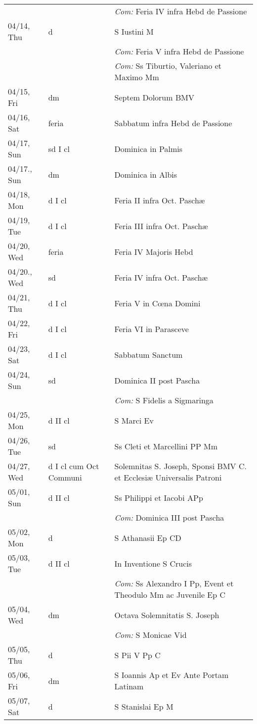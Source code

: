 \documentclass[10pt]{article}
\begin{document}
\begin{longtable}{ l l l }
 & & \textit{Com:} Feria IV infra Hebd de Passione\\
04/14, Thu & d & S Iustini M\\
 & & \textit{Com:} Feria V infra Hebd de Passione\\
 & & \textit{Com:} Ss Tiburtio, Valeriano et Maximo Mm\\
04/15, Fri & dm & Septem Dolorum BMV\\
04/16, Sat & feria & Sabbatum infra Hebd de Passione\\
04/17, Sun & sd I cl & Dominica in Palmis\\
04/17., Sun & dm & Dominica in Albis\\
04/18, Mon & d I cl & Feria II infra Oct. Paschæ\\
04/19, Tue & d I cl & Feria III infra Oct. Paschæ\\
04/20, Wed & feria & Feria IV Majoris Hebd\\
04/20., Wed & sd & Feria IV infra Oct. Paschæ\\
04/21, Thu & d I cl & Feria V in Cœna Domini\\
04/22, Fri & d I cl & Feria VI in Parasceve\\
04/23, Sat & d I cl & Sabbatum Sanctum\\
04/24, Sun & sd & Dominica II post Pascha\\
 & & \textit{Com:} S Fidelis a Sigmaringa\\
04/25, Mon & d II cl & S Marci Ev\\
04/26, Tue & sd & Ss Cleti et Marcellini PP Mm\\
04/27, Wed & d I cl cum Oct Communi & Solemnitas S. Joseph, Sponsi BMV C. et Ecclesiæ Universalis Patroni\\
05/01, Sun & d II cl & Ss Philippi et Iacobi APp\\
 & & \textit{Com:} Dominica III post Pascha\\
05/02, Mon & d & S Athanasii Ep CD\\
05/03, Tue & d II cl & In Inventione S Crucis\\
 & & \textit{Com:} Ss Alexandro I Pp, Event et Theodulo Mm ac Juvenile Ep C\\
05/04, Wed & dm & Octava Solemnitatis S. Joseph\\
 & & \textit{Com:} S Monicae Vid\\
05/05, Thu & d & S Pii V Pp C\\
05/06, Fri & dm & S Ioannis Ap et Ev Ante Portam Latinam\\
05/07, Sat & d & S Stanislai Ep M\\

\end{longtable}
\end{document}
